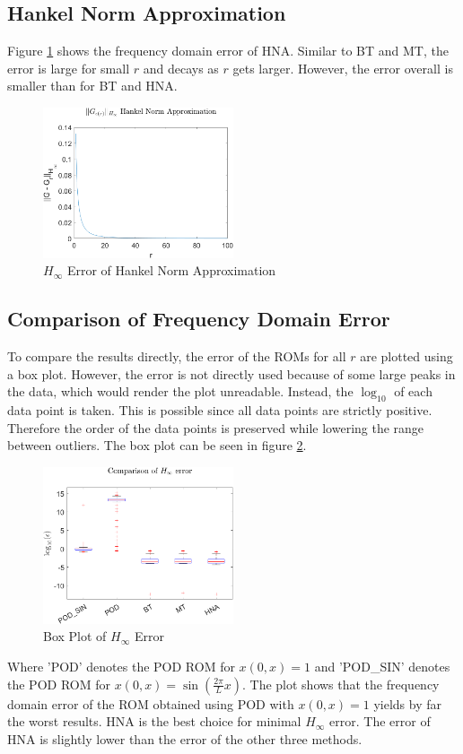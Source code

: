 \subsection{Hankel Norm Approximation}
Figure \ref{FIG-H-HNA} shows the frequency domain error of HNA.
Similar to BT and MT, the error is large for small \(r\) and decays as \(r\) gets larger.
However, the error overall is smaller than for BT and HNA.
\begin{figure}[H]
\centering
\includegraphics[width=0.5\textwidth]{images/freq/H_HNA}
\caption{$H_{\infty}$ Error of Hankel Norm Approximation}
\label{FIG-H-HNA}
\end{figure}

\subsection{Comparison of Frequency Domain Error}
To compare the results directly, the error of the ROMs for all \(r\) are plotted using a box plot.
However, the error is not directly used because of some large peaks in the data, which would render the plot unreadable.
Instead, the \(\log_{10}\) of each data point is taken.
This is possible since all data points are strictly positive. Therefore the order of the data points is preserved while lowering the range between outliers.
The box plot can be seen in figure \ref{FIG-H-BOX}.
\begin{figure}[H]
\centering
\includegraphics[width=0.5\textwidth]{images/freq/H_BOX}
\caption{Box Plot of $H_{\infty}$ Error}
\label{FIG-H-BOX}
\end{figure}
Where 'POD' denotes the POD ROM for \(x(0, x) = 1\) and 'POD\_SIN' denotes the POD ROM for \(x(0, x) =  \sin(\frac{2\pi}{L}x)\).
The plot shows that the frequency domain error of the ROM obtained using POD with \(x(0, x) = 1\) yields by far the worst results.
HNA is the best choice for minimal \(H_{\infty}\) error. 
The error of HNA is slightly lower than the error of the other three methods.

